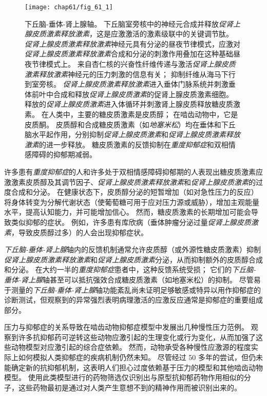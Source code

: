 \begin{figure}[htbp]
	\centering
	\texttt{[image: chap61/fig\_61\_1]}
	\caption{下丘脑-垂体-肾上腺轴。
		下丘脑室旁核中的神经元合成并释放\textit{促肾上腺皮质激素释放激素}，这是应激激活的激素级联中的关键调节肽。
		\textit{促肾上腺皮质激素释放激素}神经元具有分泌的昼夜节律模式，应激对\textit{促肾上腺皮质激素释放激素}合成和分泌的刺激作用叠加在这种基础昼夜节律模式上。
		来自杏仁核的兴奋性纤维传递与激活\textit{促肾上腺皮质激素释放激素}神经元的压力刺激的信息有关；
		抑制纤维从海马下行到室旁核。
		\textit{促肾上腺皮质激素释放激素}进入垂体门脉系统并刺激垂体前叶中合成和释放\textit{促肾上腺皮质激素}的促肾上腺皮质激素细胞。
		释放的\textit{促肾上腺皮质激素}进入体循环并刺激肾上腺皮质释放糖皮质激素。
		在人类中，主要的糖皮质激素是皮质醇；
		在啮齿动物中，它是皮质酮。
		皮质醇和合成糖皮质激素（如\textit{地塞米松}）均在垂体和下丘脑水平起作用，分别抑制\textit{促肾上腺皮质激素}和\textit{促肾上腺皮质激素释放激素}的进一步释放。
		糖皮质激素的反馈抑制在\textit{重度抑郁症}和双相情感障碍的抑郁期减弱\cite{nestler2020nestler}。}
	\label{fig:61_1}
\end{figure}


许多患有\textit{重度抑郁症}的人和许多处于双相情感障碍抑郁期的人表现出糖皮质激素应激激素皮质醇及其调节因子、\textit{促肾上腺皮质激素释放激素}和\textit{促肾上腺皮质激素}的过度合成和分泌。
在健康状态下，皮质醇分泌的短暂增加（如对急性压力的反应）将身体转变为分解代谢状态（使葡萄糖可用于应对压力源或威胁），增加主观能量水平，提高认知能力，并可能增加信心。
然而，糖皮质激素的长期增加可能会导致类似抑郁的症状。
例如，许多患有库欣病（垂体肿瘤分泌过量\textit{促肾上腺皮质激素}，导致皮质醇过多）的人会出现抑郁症状。


\textit{下丘脑-垂体-肾上腺}轴内的反馈机制通常允许皮质醇（或外源性糖皮质激素）抑制\textit{促肾上腺皮质激素释放激素}和\textit{促肾上腺皮质激素}分泌，从而抑制额外的皮质醇合成和分泌。
在大约一半的\textit{重度抑郁症}患者中，这种反馈系统受损；
它们的\textit{下丘脑-垂体-肾上腺}轴甚至可以抵抗强效合成糖皮质激素（如地塞米松）的抑制。
尽管易于测量的\textit{下丘脑-垂体-肾上腺}轴功能紊乱尚未证明足够敏感或特异以用作抑郁症的诊断测试，但观察到的异常强烈表明病理激活的应激反应通常是抑郁症的重要组成部分。


压力与抑郁症的关系导致在啮齿动物抑郁症模型中发展出几种慢性压力范例。
观察到许多抗抑郁药可逆转这些动物应激引起的生理变化或行为变化，从而加强了这些动物模型对应激引起的综合症依赖。
然而，动物承受各种慢性应激源的程度实际上如何模拟人类抑郁症的疾病机制仍然未知。
尽管经过 50 多年的尝试，但仍未能确定新的抗抑郁机制，这表明人们担心过度依赖基于压力的模型和其他啮齿动物模型。
使用此类模型进行的药物筛选仅识别出与原型抗抑郁药物作用相似的分子，这些药物最初是通过对人类产生意想不到的精神作用而被识别出来的。



